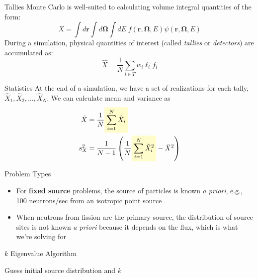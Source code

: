 \documentclass[noamssymb,svgnames]{beamer}
\newcommand{\highlight}[1]{%
  \colorbox{yellow!20}{$\displaystyle#1$}}
\begin{document}
\begin{frame}{Tallies}
  Monte Carlo is well-suited to calculating volume integral quantities of the
  form:
  \begin{equation*}
    X = \int d\mathbf{r} \int d\mathbf{\Omega} \int dE \;
    f(\mathbf{r},\mathbf{\Omega},E) \psi (\mathbf{r},\mathbf{\Omega},E)
  \end{equation*}
  During a simulation, physical quantities of interest (called \emph{tallies}
  or \emph{detectors}) are accumulated as:
  \begin{equation*}
    \hat{X} = \frac{1}{N} \sum\limits_{i \in T} w_i \ell_i f_i
  \end{equation*}
\end{frame}

\begin{frame}{Statistics}
  At the end of a simulation, we have a set of realizations for each tally,
  $\hat{X}_1, \hat{X}_2, \dots, \hat{X}_N$. We can calculate mean and variance
  as
  \begin{align*}
    \bar{X} &= \frac{1}{N} \highlight{\sum\limits_{i=1}^N \hat{X}_i} \\
    s^2_X &= \frac{1}{N-1} \left ( \frac{1}{N} \highlight{\sum\limits_{i=1}^N \hat{X}_i^2} -
    \bar{X}^2 \right )
  \end{align*}
\end{frame}

\begin{frame}{Problem Types}
  \begin{itemize}
  \item For \textbf{fixed source} problems, the source of particles is known
    \emph{a priori}, e.g., 100 neutrons/sec from an isotropic point source
  \item When neutrons from fission are the primary source, the distribution of
    source sites is not known \emph{a priori} because it depends on the flux,
    which is what we're solving for
  \end{itemize}
\end{frame}

\begin{frame}{$k$ Eigenvalue Algorithm}
  \begin{algorithm}[H]
    \DontPrintSemicolon
    Guess initial source distribution and $k$\;
  \end{algorithm}
\end{frame}
\end{document}
